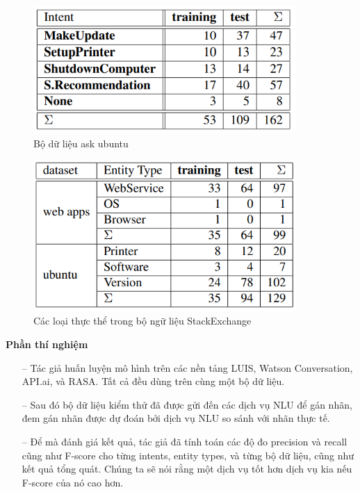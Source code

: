 \begin{figure}[htp]
    \centering
    \includegraphics[width=10cm]{images/comparisonimg/askubuntudatasets.png}
    \caption{Bộ dữ liệu ask ubuntu}
    \label{fig:comparisonimg-askubuntudatasets}
\end{figure}

\begin{figure}[htp]
    \centering
    \includegraphics[width=10cm]{images/comparisonimg/entityTypesStackExchange.png}
    \caption{Các loại thực thể trong bộ ngữ liệu StackExchange}
    \label{fig:comparisonimg-entityTypesStackExchange}
\end{figure}

\textbf{Phần thí nghiệm}

\begin{itemize}
    \item[--] Tác giả huấn luyện mô hình trên các nền tảng LUIS, Watson Conversation, API.ai, và RASA. Tất cả đều dùng trên cùng một bộ dữ liệu.
        \item[--]Sau đó bộ dữ liệu kiểm thử đã được gửi đến các dịch vụ NLU để gán nhãn, đem gán nhãn được dự đoán bởi dịch vụ NLU so sánh với nhãn thực tế.
        \item[--]Để mà đánh giá kết quả, tác giả đã tính toán các độ đo precision và recall cũng như F-score cho từng intents, entity types, và từng bộ dữ liệu, cũng như kết quả tổng quát. Chúng ta sẽ nói rằng một dịch vụ tốt hơn dịch vụ kia nếu F-score của nó cao hơn.
\end{itemize}

